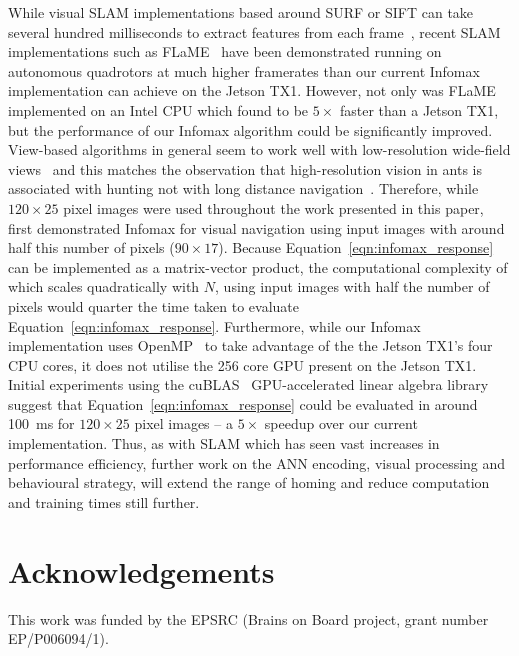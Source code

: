 \documentclass[letterpaper]{article}
\begin{document}
While visual SLAM implementations based around SURF or SIFT can take several hundred milliseconds to extract features from each frame~\citep{Bay2006}, recent SLAM implementations such as FLaME~\citep{Greene2017} have been demonstrated running on autonomous quadrotors at much higher framerates than our current Infomax implementation can achieve on the Jetson TX1.
However, not only was FLaME implemented on an Intel CPU which \citet{Biddulph2018} found to be $5\times$ faster than a Jetson TX1, but the performance of our Infomax algorithm could be significantly improved.
View-based algorithms in general seem to work well with low-resolution wide-field views~\citep{Wystrach2016} and this matches the observation that high-resolution vision in ants is associated with hunting not with long distance navigation~\citep{Wystrach2016}.
Therefore, while $120 \times 25$ pixel images were used throughout the work presented in this paper, \citet{Baddeley2012} first demonstrated Infomax for visual navigation using input images with around half this number of pixels ($90\times 17$).
Because Equation~\ref{eqn:infomax_response} can be implemented as a matrix-vector product, the computational complexity of which scales quadratically with $N$, using input images with half the number of pixels would quarter the time taken to evaluate Equation~\ref{eqn:infomax_response}. 
Furthermore, while our Infomax implementation uses OpenMP~\citep{Dagum1998} to take advantage of the the Jetson TX1's four CPU cores, it does not utilise the \num{256} core GPU present on the Jetson TX1. 
Initial experiments using the cuBLAS~\citep{NVIDIACorporation2007} GPU-accelerated linear algebra library suggest that Equation~\ref{eqn:infomax_response} could be evaluated in around \SI{100}{\milli\second} for $120 \times 25$ pixel images -- a $5 \times$ speedup over our current implementation.
Thus, as with SLAM which has seen vast increases in performance efficiency, further work on the ANN encoding, visual processing and behavioural strategy, will extend the range of homing and reduce computation and training times still further.

\section{Acknowledgements}
This work was funded by the EPSRC (Brains on Board project, grant number EP/P006094/1).

\small

\end{document}
